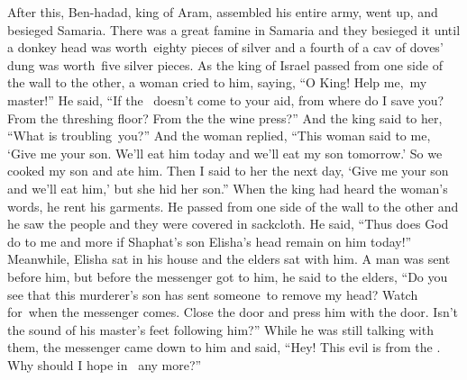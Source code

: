 \begin{inparaenum}
   After this, Ben-hadad, king of Aram, assembled his entire army, went up, and besieged Samaria.%
   There was a great famine in Samaria and they besieged it until a donkey head was worth\understood{}\ eighty pieces of silver and a fourth of a cav of doves' dung was worth\understood{}\ five silver pieces.%
   As the king of Israel passed from one side of the wall to the other, a woman cried to him, saying, ``O King! Help me,\understood{}\ my master!''%
   He said, ``If the \lord\ doesn't come to your aid, from where do I save you? From the threshing floor? From the the wine press?''%
   And the king said to her, ``What is troubling\understood{}\ you?'' And the woman replied, ``This woman said to me, `Give me your son. We'll eat him today and we'll eat my son tomorrow.'%
   So we cooked my son and ate him. Then I said to her the next day, `Give me your son and we'll eat him,' but she hid her son.''%
   When the king had heard the woman's words, he rent his garments. He passed from one side of the wall to the other and he saw the people and they were covered in sackcloth.%
   He said, ``Thus does God do to me and more if Shaphat's son Elisha's head remain on him today!''%
   Meanwhile, Elisha sat in his house and the elders sat with him. A man was sent before him, but before the messenger got to him, he said to the elders, ``Do you see that this murderer's son has sent someone\understood{}\ to remove my head? Watch for\understood{}\ when the messenger comes. Close the door and press him with the door. Isn't the sound of his master's feet following him?''%
   While he was still talking with them, the messenger came down to him and said, ``Hey! This evil is from the \lord. Why should I hope in \god\ any more?''%
\end{inparaenum}
